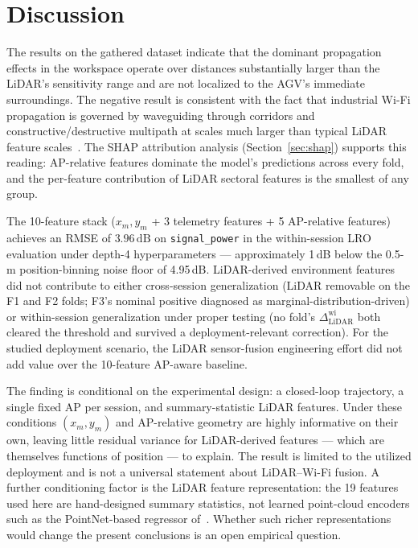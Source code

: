 \documentclass[conference]{IEEEtran}
\newcommand{\dlidarw}{\ensuremath{\Delta_{\mathrm{LiDAR}}^{\mathrm{wi}}}}
\newcommand{\dB}{\,\mathrm{dB}}
\begin{document}
\section{Discussion}
\label{sec:discussion}

The results on the gathered dataset indicate that the dominant propagation effects in the workspace operate over distances substantially larger than the LiDAR's sensitivity range and are not localized to the AGV's immediate surroundings. 
The negative result is consistent with the fact that industrial Wi\nobreakdash-Fi propagation is governed by waveguiding through corridors and constructive/destructive multipath at scales much larger than typical LiDAR feature scales~\cite{cena2025wifi}. 
The SHAP attribution analysis (Section~\ref{sec:shap}) supports this reading: AP-relative features dominate the model's predictions across every fold, and the per-feature contribution of LiDAR sectoral features is the smallest of any group.

The 10-feature stack ($x_m, y_m$ + 3 telemetry features + 5 AP-relative features) achieves an RMSE of $3.96\dB$ on \texttt{signal\_power} in the within-session LRO evaluation under depth-4 hyperparameters --- approximately 1\,dB below the 0.5-m position-binning noise floor of 4.95\,dB.  LiDAR-derived environment features did not contribute to either cross-session generalization (LiDAR removable on the F1 and F2 folds; F3's nominal positive diagnosed as marginal-distribution-driven) or within-session generalization under proper testing (no fold's $\dlidarw$ both cleared the threshold and survived a deployment-relevant correction). For the studied deployment scenario, the LiDAR sensor-fusion engineering effort did not add value over the 10-feature AP-aware baseline.

The finding is conditional on the experimental design: a closed-loop trajectory, a single fixed AP per session, and summary-statistic LiDAR features. Under these conditions $(x_m, y_m)$ and AP-relative geometry are highly informative on their own, leaving little residual variance for LiDAR-derived features --- which are themselves functions of position --- to explain. The result is limited to the utilized deployment and is not a universal statement about LiDAR--Wi\nobreakdash-Fi fusion. A further conditioning factor is the LiDAR feature representation: the 19 features used here are hand-designed summary statistics, not learned point-cloud encoders such as the PointNet-based regressor of~\cite{nist2024mmwave}. Whether such richer representations would change the present conclusions is an open empirical question.
\end{document}
